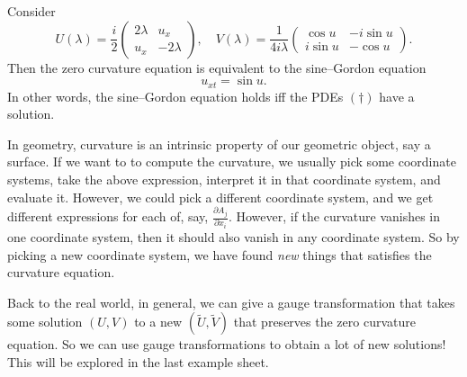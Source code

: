 \documentclass[a4paper]{article}
\begin{document}
\begin{eg}
  Consider
  \[
    U(\lambda) = \frac{i}{2}
    \begin{pmatrix}
      2\lambda & u_x\\
      u_x & -2\lambda
    \end{pmatrix},\quad
    V(\lambda) =
    \frac{1}{4i\lambda}
    \begin{pmatrix}
      \cos u & -i \sin u\\
      i \sin u & -\cos u
    \end{pmatrix}.
  \]
  Then the zero curvature equation is equivalent to the sine--Gordon equation
  \[
    u_{xt} = \sin u.
  \]
  In other words, the sine--Gordon equation holds iff the PDEs $(\dagger)$ have a solution.
\end{eg}
In geometry, curvature is an intrinsic property of our geometric object, say a surface. If we want to to compute the curvature, we usually pick some coordinate systems, take the above expression, interpret it in that coordinate system, and evaluate it. However, we could pick a different coordinate system, and we get different expressions for each of, say, $\frac{\partial A_j}{\partial x_i}$. However, if the curvature vanishes in one coordinate system, then it should also vanish in any coordinate system. So by picking a new coordinate system, we have found \emph{new} things that satisfies the curvature equation.

Back to the real world, in general, we can give a gauge transformation that takes some solution $(U, V)$ to a new $(\tilde{U}, \tilde{V})$ that preserves the zero curvature equation. So we can use gauge transformations to obtain a lot of new solutions! This will be explored in the last example sheet.
\end{document}
